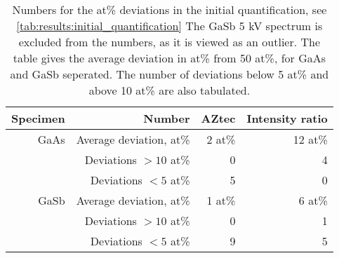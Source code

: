 \begin{table}[phtb]
    \begin{center}
        \caption{
            Numbers for the at\% deviations in the initial quantification, see \cref{tab:results:initial_quantification}
            The GaSb 5 kV spectrum is excluded from the numbers, as it is viewed as an outlier.
            The table gives the average deviation in at\% from 50 at\%, for GaAs and GaSb seperated.
            The number of deviations below 5 at\% and above 10 at\% are also tabulated.
        }
        \label{tab:results:initial_quantification_stats}
        \begin{tabular}{rrrr}
            \hline
            \textbf{Specimen} & \textbf{Number}         & \textbf{AZtec} & \textbf{Intensity ratio} \\
            \hline
            GaAs              & Average deviation, at\% & 2 at\%         & 12 at\%                  \\
                              & Deviations $>10$ at\%   & 0              & 4                        \\
                              & Deviations  $<5$  at\%  & 5              & 0                        \\
            \hline
            GaSb              & Average deviation, at\% & 1 at\%         & 6 at\%                   \\
                              & Deviations $>10$ at\%   & 0              & 1                        \\
                              & Deviations  $<5$  at\%  & 9              & 5                        \\

            \hline
        \end{tabular}
    \end{center}
\end{table}
